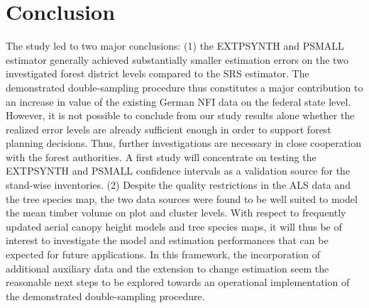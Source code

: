 \documentclass[remotesensing,article,submit,moreauthors,pdftex,10pt,a4paper]{mdpi}
\newcommand{\psmall}{PSMALL}
\newcommand{\extpsynth}{EXTPSYNTH}
\begin{document}

\section{Conclusion}
\label{sec:concl}

The study led to two major conclusions: (1) the \extpsynth{} and \psmall{} estimator generally achieved substantially smaller estimation errors on the two investigated forest district levels compared to the SRS estimator. The demonstrated double-sampling procedure thus constitutes a major contribution to an increase in value of the existing German NFI data on the federal state level. However, it is not possible to conclude from our study results alone whether the realized error levels are already sufficient enough in order to support forest planning decisions. Thus, further investigations are necessary in close cooperation with the forest authorities. A first study will concentrate on testing the \extpsynth{} and \psmall{} confidence intervals as a validation source for the stand-wise inventories. (2) Despite the quality restrictions in the ALS data and the tree species map, the two data sources were found to be well suited to model the mean timber volume on plot and cluster levels. With respect to frequently updated aerial canopy height models and tree species maps, it will thus be of interest to investigate the model and estimation performances that can be expected for future applications. In this framework, the incorporation of additional auxiliary data and the extension to change estimation seem the reasonable next steps to be explored towards an operational implementation of the demonstrated double-sampling procedure.


\vspace{6pt} 
%
%
%
%
\end{document}
